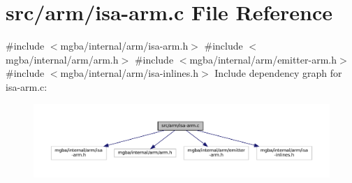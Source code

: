 \hypertarget{isa-arm_8c}{}\section{src/arm/isa-\/arm.c File Reference}
\label{isa-arm_8c}
{\ttfamily \#include $<$mgba/internal/arm/isa-\/arm.\+h$>$}\newline
{\ttfamily \#include $<$mgba/internal/arm/arm.\+h$>$}\newline
{\ttfamily \#include $<$mgba/internal/arm/emitter-\/arm.\+h$>$}\newline
{\ttfamily \#include $<$mgba/internal/arm/isa-\/inlines.\+h$>$}\newline
Include dependency graph for isa-\/arm.c\+:
\nopagebreak
\begin{figure}[H]
\begin{center}
\leavevmode
\includegraphics[width=350pt]{isa-arm_8c__incl}
\end{center}
\end{figure}
